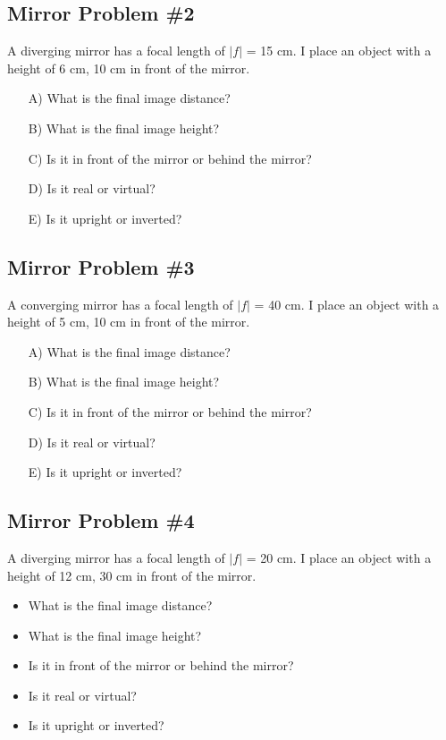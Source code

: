 \documentclass[11pt]{article}
\begin{document}
\subsection{Mirror Problem \#2}
A diverging mirror has a focal length of $|f|$ = 15 cm.  I place an object with a height of 6 cm, 10 cm in front of the mirror.  

\begin{itemize}
\item[A)] What is the final image distance?
\item[B)] What is the final image height?
\item[C)] Is it in front of the mirror or behind the mirror?  
\item[D)] Is it real or virtual?
\item[E)] Is it upright or inverted?
\end{itemize}

\subsection{Mirror Problem \#3}
A converging mirror has a focal length of $|f|$ = 40 cm.  I place an object with a height of 5 cm, 10 cm in front of the mirror.  

\begin{itemize}
\item[A)] What is the final image distance?
\item[B)] What is the final image height?
\item[C)] Is it in front of the mirror or behind the mirror?  
\item[D)] Is it real or virtual?
\item[E)] Is it upright or inverted?
\end{itemize}

\subsection{Mirror Problem \#4}
A diverging mirror has a focal length of $|f|$ = 20 cm.  I place an object with a height of 12 cm, 30 cm in front of the mirror.  

\begin{itemize}
\item What is the final image distance?
\item What is the final image height?
\item Is it in front of the mirror or behind the mirror?  
\item Is it real or virtual?
\item Is it upright or inverted?
\end{itemize}
\end{document}
